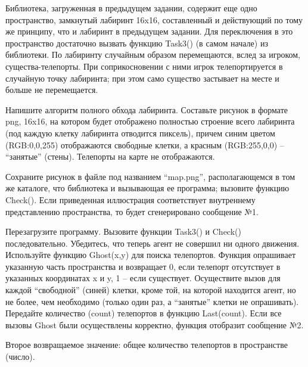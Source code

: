 
Библиотека, загруженная в предыдущем задании, содержит еще одно пространство, замкнутый лабиринт 16x16, составленный и действующий по тому же принципу, что и лабиринт в предыдущем задании. Для переключения в это пространство достаточно вызвать функцию Task3() (в самом начале) из библиотеки. По лабиринту случайным образом перемещаются, вслед за игроком, существа-телепорты. При соприкосновении с ними игрок телепортируется в случайную точку лабиринта; при этом само существо застывает на месте и больше не перемещается.

Напишите алгоритм полного обхода лабиринта. Составьте рисунок в формате png, 16x16, на котором будет отображено полностью строение всего лабиринта (под каждую клетку лабиринта отводится пиксель), причем синим цветом (RGB:0,0,255) отображаются свободные клетки, а красным (RGB:255,0,0) – “занятые” (стены). Телепорты на карте не отображаются.

Сохраните рисунок в файле под названием “map.png”, располагающемся в том же каталоге, что библиотека и вызывающая ее программа; вызовите функцию Check(). Если приведенная иллюстрация соответствует внутреннему представлению пространства, то будет сгенерировано сообщение №1.

Перезагрузите программу. Вызовите функции Task3() и Check() последовательно. Убедитесь, что теперь агент не совершил ни одного движения. Используйте функцию Ghost(x,y) для поиска телепортов. Функция опрашивает указанную часть пространства и возвращает 0, если телепорт отсутствует в указанных координатах x и y, 1 – если существует. Осуществите вызов для каждой “свободной” (синей) клетки, кроме той, на которой находится агент, но не более, чем необходимо (только один раз, а “занятые” клетки не опрашивать). Передайте количество (count) телепортов в функцию Last(count). Если все вызовы Ghost были осуществлены корректно, функция отобразит сообщение №2.

Второе возвращаемое значение: общее количество телепортов в пространстве (число).

